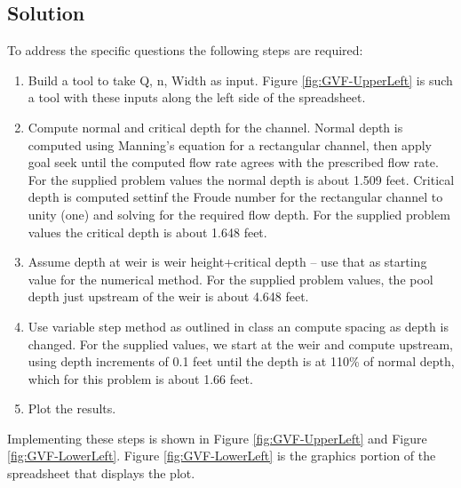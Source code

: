 \documentclass[12pt]{article}
\begin{document}
\begin{enumerate}
\section*{\small{Solution}}
To address the specific questions the following steps are required:
\begin{enumerate}
\item Build a tool to take Q, n, Width as input. Figure \ref{fig:GVF-UpperLeft} is such a tool with these inputs along the left side of the spreadsheet.
\item Compute normal and critical depth for the channel.
Normal depth is computed using Manning's equation for a rectangular channel, then apply goal seek until the computed flow rate agrees with the prescribed flow rate.  For the supplied problem values the normal depth is about 1.509 feet.  Critical depth is computed settinf the Froude number for the rectangular channel to unity (one) and solving for the required flow depth.  For the supplied problem values the critical depth is about 1.648 feet.
\item Assume depth at weir is weir height+critical depth -- use that as starting value for the numerical method.  For the supplied problem values, the pool depth just upstream of the weir is about 4.648 feet.
\item Use variable step method as outlined in class an compute spacing as depth is changed.  For the supplied values, we start at the weir and compute upstream, using depth increments of 0.1 feet until the depth is at 110\% of normal depth, which for this problem is about 1.66 feet.
\item Plot the results.
\end{enumerate}

Implementing these steps is shown in Figure \ref{fig:GVF-UpperLeft} and Figure \ref{fig:GVF-LowerLeft}.   Figure \ref{fig:GVF-LowerLeft} is the graphics portion of the spreadsheet that displays the plot.


\end{enumerate}
\end{document}
